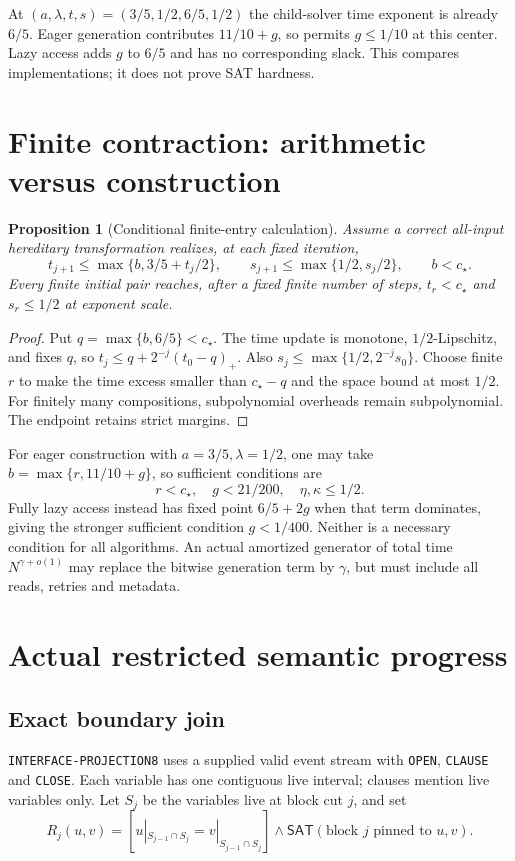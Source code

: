 \documentclass[11pt]{article}
\newtheorem{proposition}{Proposition}[section]
\newcommand{\SAT}{\mathsf{SAT}}
\begin{document}
At $(a,\lambda,t,s)=(3/5,1/2,6/5,1/2)$ the child-solver time exponent
is already $6/5$. Eager generation contributes $11/10+g$, so permits
$g\le1/10$ at this center. Lazy access adds $g$ to $6/5$ and has
no corresponding slack. This compares implementations; it does not prove
SAT hardness.

\section{Finite contraction: arithmetic versus construction}
\begin{proposition}[Conditional finite-entry calculation]
Assume a correct all-input hereditary transformation realizes, at each
fixed iteration,
\[
 t_{j+1}\le\max\{b,3/5+t_j/2\},\qquad
 s_{j+1}\le\max\{1/2,s_j/2\},\qquad b<c_\star.
\]
Every finite initial pair reaches, after a fixed finite number of steps,
$t_r<c_\star$ and $s_r\le1/2$ at exponent scale.
\end{proposition}
\begin{proof}
Put $q=\max\{b,6/5\}<c_\star$. The time update is monotone,
$1/2$-Lipschitz, and fixes $q$, so
$t_j\le q+2^{-j}(t_0-q)_+$.
Also $s_j\le\max\{1/2,2^{-j}s_0\}$. Choose finite $r$ to make the
time excess smaller than $c_\star-q$ and the space bound at most $1/2$.
For finitely many compositions, subpolynomial overheads remain
subpolynomial. The endpoint retains strict margins.
\end{proof}
For eager construction with $a=3/5,\lambda=1/2$, one may take
$b=\max\{r,11/10+g\}$, so sufficient conditions are
\[
 r<c_\star,\quad g<21/200,\quad \eta,\kappa\le1/2.
\]
Fully lazy access instead has fixed point $6/5+2g$ when that term dominates,
giving the stronger sufficient condition $g<1/400$.
Neither is a necessary condition for all algorithms.
An actual amortized generator of total time $N^{\gamma+o(1)}$ may replace
the bitwise generation term by $\gamma$, but must include all reads,
retries and metadata.

\section{Actual restricted semantic progress}
\subsection{Exact boundary join}
\texttt{INTERFACE-PROJECTION8} \cite{interface} uses a supplied valid
event stream with \texttt{OPEN}, \texttt{CLAUSE} and \texttt{CLOSE}.
Each variable has one contiguous live interval; clauses mention live
variables only. Let $S_j$ be the variables live at block cut $j$, and set
\[
 R_j(u,v)=
 [u|_{S_{j-1}\cap S_j}=v|_{S_{j-1}\cap S_j}]
 \land\SAT(\text{block }j\text{ pinned to }u,v).
\]
\end{document}
